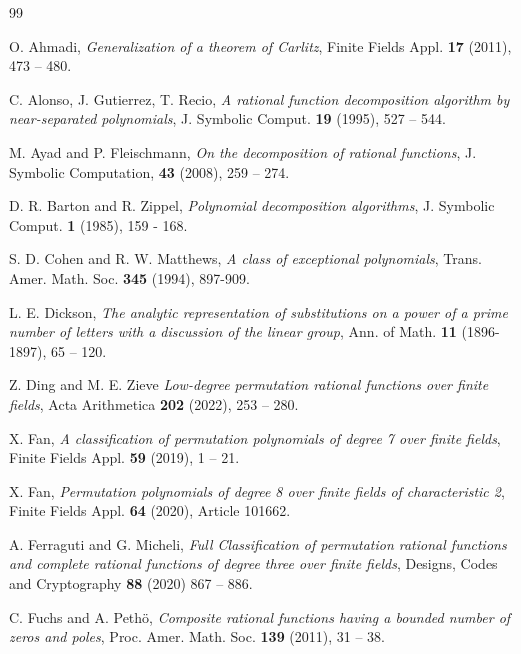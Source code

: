 \documentclass{amsart}
\numberwithin{equation}{section}
\theoremstyle{definition}
\begin{document}

\begin{thebibliography}{99}

O. Ahmadi, {\it Generalization of a theorem of Carlitz}, Finite Fields Appl. {\bf 17} (2011), 473 -- 480.

C. Alonso, J. Gutierrez, T. Recio, 
{\it A rational function decomposition algorithm by near-separated polynomials},
J. Symbolic Comput. {\bf 19} (1995), 527 -- 544.

M. Ayad and P. Fleischmann, {\it On the decomposition of rational functions}, J. Symbolic Computation, {\bf 43} (2008), 259 -- 274.

D. R. Barton and R. Zippel, 
{\it Polynomial decomposition algorithms}, 
J. Symbolic Comput. {\bf 1} (1985), 159 - 168.


S. D. Cohen and R. W. Matthews, {\it A class of exceptional polynomials}, Trans. Amer. Math. Soc. {\bf 345} (1994), 897-909.

L. E. Dickson,  {\it The analytic representation of substitutions on a power of a prime number of letters with a discussion of the linear group}, Ann. of Math.  {\bf 11} (1896-1897), 65 -- 120.

Z. Ding and M. E. Zieve {\it Low-degree permutation rational functions over finite fields}, Acta Arithmetica {\bf 202} (2022), 253 -- 280.

X. Fan, {\it A classification of permutation polynomials of degree 7 over finite fields}, Finite Fields Appl. {\bf 59} (2019), 1 -- 21.

X. Fan, {\it Permutation polynomials of degree 8 over finite fields of characteristic 2}, Finite Fields Appl. {\bf 64} (2020), Article 101662. %


A. Ferraguti and G. Micheli, {\it Full Classification of permutation rational functions and complete rational functions of degree three over finite fields},
Designs, Codes and Cryptography {\bf 88} (2020)  867 -- 886.

C. Fuchs and A. Peth\"o, 
{\it Composite rational functions having a bounded number of zeros and poles}, Proc. Amer. Math. Soc. {\bf 139} (2011), 31 -- 38.


\end{thebibliography}
\end{document}
